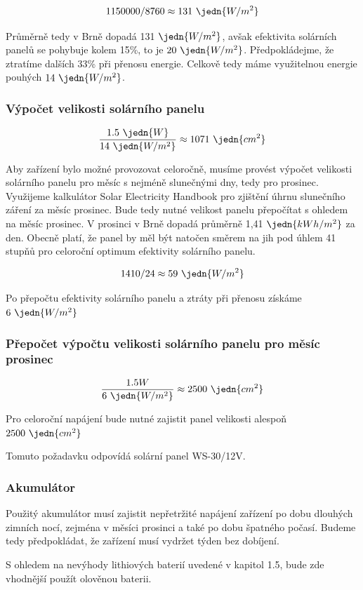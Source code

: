 $$1150000/8760 \approx 131 \ \jedn{W/m^2} $$

Průměrně tedy v Brně dopadá 131 $\jedn{W/m^2}$, avšak efektivita solárních panelů se pohybuje kolem 15\%, to je $20\ \jedn{W/m^2}$. Předpokládejme, že ztratíme dalších 33\% při přenosu energie. Celkově tedy máme využitelnou energie pouhých $14\ \jedn{W/m^2}$.

\subsubsection{Výpočet velikosti solárního panelu}
$$\frac{1.5\ \jedn{W}}{14\ \jedn{W/m^2}} \approx 1071 \ \jedn{cm^2}$$

Aby zařízení bylo možné provozovat celoročně, musíme provést výpočet velikosti solárního panelu pro měsíc s nejméně slunečnými dny, tedy pro prosinec. Využijeme kalkulátor Solar Electricity Handbook \cite{solar} pro zjištění úhrnu slunečního záření za měsíc prosinec.
Bude tedy nutné velikost panelu přepočítat s ohledem na měsíc prosinec. V prosinci v Brně dopadá průměrně 1,41 $\jedn{kWh/m^2}$ za den. Obecně platí, že panel by měl být natočen směrem na jih pod úhlem 41 stupňů pro celoroční optimum efektivity solárního panelu.


$$1410/24 \approx 59 \ \jedn{W/m^2} $$

Po přepočtu efektivity solárního panelu a ztráty při přenosu získáme $6 \ \jedn{W/m^2}$

\subsubsection{Přepočet výpočtu velikosti solárního panelu pro měsíc prosinec}
$$\frac{1.5W}{6\ \jedn{W/m^2}} \approx 2500 \ \jedn{cm^2}$$

Pro celoroční napájení bude nutné zajistit panel velikosti alespoň $2500 \ \jedn{cm^2}$

Tomuto požadavku odpovídá solární panel WS-30/12V.

\subsubsection{Akumulátor}

Použitý akumulátor musí zajistit nepřetržité napájení zařízení po dobu dlouhých zimních nocí, zejména v měsíci prosinci a také po dobu špatného počasí. Budeme tedy předpokládat, že zařízení musí vydržet týden bez dobíjení.

S ohledem na  nevýhody lithiových baterií uvedené v kapitol 1.5, bude zde vhodnější použít olověnou baterii.

